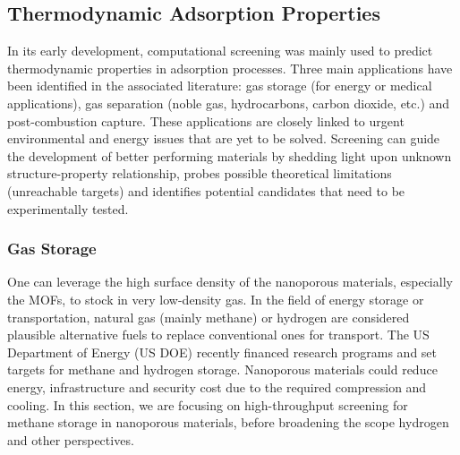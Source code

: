 \documentclass[main.tex]{subfiles}
\begin{document}
\subsection{Thermodynamic Adsorption Properties}

In its early development, computational screening was mainly used to predict thermodynamic properties in adsorption processes. Three main applications have been identified in the associated literature: gas storage (for energy or medical applications), gas separation (noble gas, hydrocarbons, carbon dioxide, etc.) and post-combustion  capture. These applications are closely linked to urgent environmental and energy issues that are yet to be solved. Screening can guide the development of better performing materials by shedding light upon unknown structure-property relationship, probes possible theoretical limitations (unreachable targets) and identifies potential candidates that need to be experimentally tested.

\subsubsection{Gas Storage}

One can leverage the high surface density of the nanoporous materials, especially the MOFs, to stock in very low-density gas. In the field of energy storage or transportation, natural gas (mainly methane) or hydrogen are considered plausible alternative fuels to replace conventional ones for transport. The US Department of Energy (US DOE) recently financed research programs and set targets for methane and hydrogen storage. Nanoporous materials could reduce energy, infrastructure and security cost due to the required compression and cooling. In this section, we are focusing on high-throughput screening for methane storage in nanoporous materials, before broadening the scope hydrogen and other perspectives.
\end{document}
